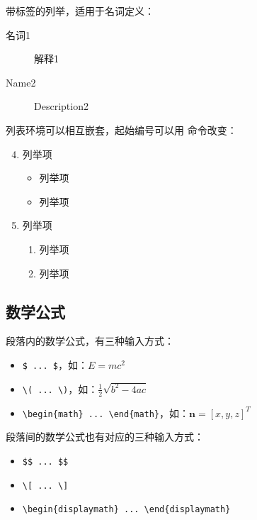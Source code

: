 带标签的列举，适用于名词定义：
\begin{description}
	\item[名词1] 解释1
	\item[Name2] Description2
\end{description}

列表环境可以相互嵌套，起始编号可以用  命令改变：
\begin{enumerate}
    \setcounter{enumi}{3}
	\item 列举项
    \begin{itemize}
    	\item 列举项
    	\item 列举项
    \end{itemize}
	\item 列举项
	\begin{enumerate}
    	\item 列举项
    	\item 列举项
	\end{enumerate}
\end{enumerate}


\subsection{数学公式}
段落内的数学公式，有三种输入方式：
\begin{itemize}
\item \verb|$ ... $|，如：$E=mc^2$
\item \verb|\( ... \)|，如：\(\frac{1}{2}\sqrt{b^2-4ac}\)
\item \verb|\begin{math} ... \end{math}|，如：\begin{math}\mathbf{n}=[x, y, z]^T\end{math}
\end{itemize}

段落间的数学公式也有对应的三种输入方式：
\begin{itemize}
\item \verb|$$ ... $$|
\item \verb|\[ ... \]|
\item \verb|\begin{displaymath} ... \end{displaymath}|
\end{itemize}


